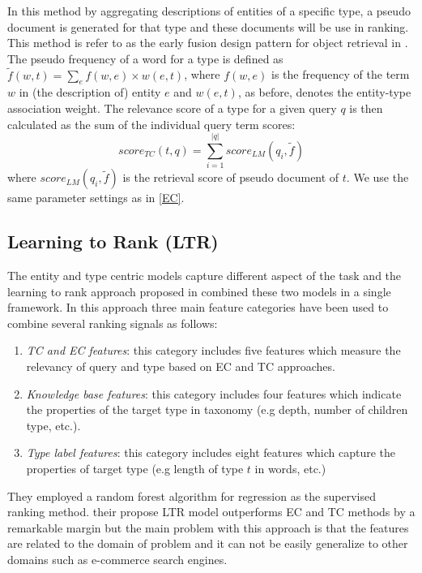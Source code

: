 In this method by aggregating descriptions of entities of a specific type, a pseudo document is generated for that type and these documents will be use in ranking. This method is refer to as the early fusion design pattern for object retrieval in \cite{zhang2017design}. The pseudo frequency of a word for a type is defined as 
$\tilde{f}(w,t) = \sum_{e}{f(w,e)\times w(e,t)}$, where $f(w,e)$ is the frequency of the term $w$ in (the description of) entity $e$ and $w(e,t)$, as before, denotes the entity-type association weight. The relevance score of a type for a given query $q$ is then calculated as the sum of the individual query term scores:
\begin{equation}
score_{TC}(t,q) = \sum_{i=1}^{|q|}{score_{LM}(q_i,\tilde{f})}
\end{equation}
where $score_{LM}(q_i,\tilde{f})$ is the retrieval score of pseudo document of $t$. We use the same parameter settings as in \ref{EC}.

\subsection{Learning to Rank (LTR)}
The entity and type centric models capture different aspect of the task and the learning to rank approach proposed in \cite{Garigliotti:2017:TTI:3077136.3080659} combined these two models in a single framework. In this approach three main feature categories have been used to combine several ranking signals as follows:
\begin{enumerate}
	\item \textit{TC and EC features}: this category includes five features which measure the relevancy of query and type based on EC and TC approaches.
	\item \textit{Knowledge base features}: this category includes four features which indicate the properties of the target type in taxonomy (e.g depth, number of children type, etc.).
	\item \textit{Type label features}: this category includes eight features which capture the properties of target type (e.g length of type $t$ in words, etc.)
\end{enumerate}
They employed a random forest algorithm for regression as the supervised ranking method. their propose LTR model outperforms EC and TC methods by a remarkable margin but the main problem with this approach is that the features are related to the domain of problem and it can not be easily generalize to other domains such as e-commerce search engines.
